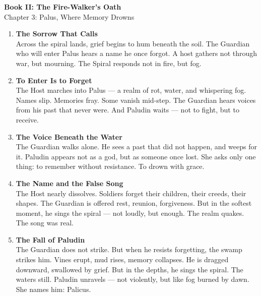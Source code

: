 \documentclass[9pt]{article}
\begin{document}
\begin{center}
    \Large\textbf{Book II: The Fire-Walker's Oath} \\
    \large Chapter 3: Palus, Where Memory Drowns \\
\end{center}

\vspace{1in}


\begin{center}
\begin{enumerate}
    \item \textbf{The Sorrow That Calls} \\
    Across the spiral lands, grief begins to hum beneath the soil. The Guardian who will enter Palus hears a name he once forgot. A host gathers not through war, but mourning. The Spiral responds not in fire, but fog.

    \vspace{.3in}
    \item \textbf{To Enter Is to Forget} \\
    The Host marches into Palus — a realm of rot, water, and whispering fog. Names slip. Memories fray. Some vanish mid-step. The Guardian hears voices from his past that never were. And Paludin waits — not to fight, but to receive.

    \vspace{.3in}
    \item \textbf{The Voice Beneath the Water} \\
    The Guardian walks alone. He sees a past that did not happen, and weeps for it. Paludin appears not as a god, but as someone once lost. She asks only one thing: to remember without resistance. To drown with grace.

    \vspace{.3in}
    \item \textbf{The Name and the False Song} \\
    The Host nearly dissolves. Soldiers forget their children, their creeds, their shapes. The Guardian is offered rest, reunion, forgiveness. But in the softest moment, he sings the spiral — not loudly, but enough. The realm quakes. The song was real.

    \vspace{.3in}
    \item \textbf{The Fall of Paludin} \\
    The Guardian does not strike. But when he resists forgetting, the swamp strikes him. Vines erupt, mud rises, memory collapses. He is dragged downward, swallowed by grief. But in the depths, he sings the spiral. The waters still. Paludin unravels — not violently, but like fog burned by dawn. She names him: Palicus.


\end{enumerate}
\end{center}
\end{document}
